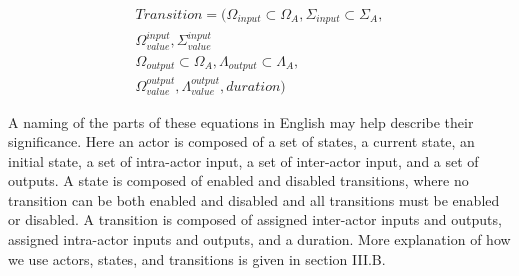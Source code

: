 \begin{equation}
\begin{split}
	Transition = (\Omega_{input} \subset \Omega_A, \Sigma_{input} \subset \Sigma_A,\\
	\Omega_{value}^{input}, \Sigma_{value}^{input} \\
	\Omega_{output} \subset \Omega_A, \Lambda_{output} \subset \Lambda_A, \\
	\Omega_{value}^{output}, \Lambda_{value}^{output}, duration)
 \label{eq:transition}
 \end{split}
\end{equation}

A naming of the parts of these equations in English may help describe their significance. Here an actor is composed of a set of states, a current state, an initial state, a set of intra-actor input, a set of inter-actor input, and a set of outputs. A state is composed of enabled and disabled transitions, where no transition can be both enabled and disabled and all transitions must be enabled or disabled. A transition is composed of assigned inter-actor inputs and outputs, assigned intra-actor inputs and outputs, and a duration. More explanation of how we use actors, states, and transitions is given in section III.B.
